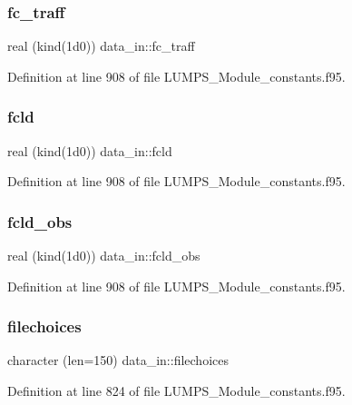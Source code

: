 \subsubsection{\texorpdfstring{fc\+\_\+traff}{fc\_traff}}
{\footnotesize\ttfamily real (kind(1d0)) data\+\_\+in\+::fc\+\_\+traff}



Definition at line 908 of file L\+U\+M\+P\+S\+\_\+\+Module\+\_\+constants.\+f95.

\mbox{\label{namespacedata__in_a8afa15b03c067e57c570544bd5562ac1}} 
\subsubsection{\texorpdfstring{fcld}{fcld}}
{\footnotesize\ttfamily real (kind(1d0)) data\+\_\+in\+::fcld}



Definition at line 908 of file L\+U\+M\+P\+S\+\_\+\+Module\+\_\+constants.\+f95.

\mbox{\label{namespacedata__in_a03109ad2e583af2eb4b59e2e95758a72}} 
\subsubsection{\texorpdfstring{fcld\+\_\+obs}{fcld\_obs}}
{\footnotesize\ttfamily real (kind(1d0)) data\+\_\+in\+::fcld\+\_\+obs}



Definition at line 908 of file L\+U\+M\+P\+S\+\_\+\+Module\+\_\+constants.\+f95.

\mbox{\label{namespacedata__in_a06dcdca28402576db115b411e6a1f090}} 
\subsubsection{\texorpdfstring{filechoices}{filechoices}}
{\footnotesize\ttfamily character (len=150) data\+\_\+in\+::filechoices}



Definition at line 824 of file L\+U\+M\+P\+S\+\_\+\+Module\+\_\+constants.\+f95.

